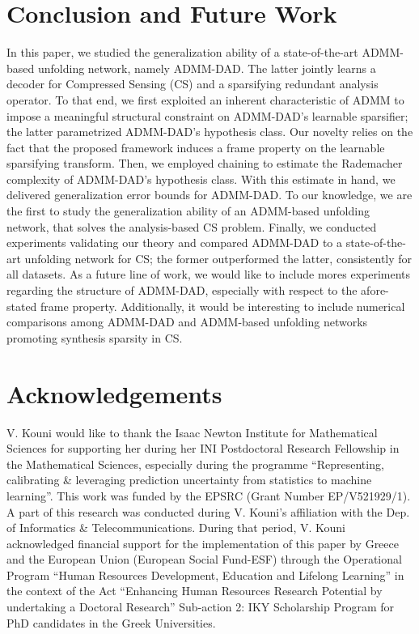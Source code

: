 \documentclass[preprint,12pt]{elsarticle}
\begin{document}
\section{Conclusion and Future Work}

In this paper, we studied the generalization ability of a state-of-the-art ADMM-based unfolding network, namely ADMM-DAD. The latter jointly learns a decoder for Compressed Sensing (CS) and a sparsifying redundant analysis operator. To that end, we first exploited an inherent characteristic of ADMM to impose a meaningful structural constraint on ADMM-DAD's learnable sparsifier; the latter parametrized ADMM-DAD's hypothesis class. Our novelty relies on the fact that the proposed framework induces a frame property on the learnable sparsifying transform. Then, we employed chaining to estimate the Rademacher complexity of ADMM-DAD's hypothesis class. With this estimate in hand, we delivered generalization error bounds for ADMM-DAD. To our knowledge, we are the first to study the generalization ability of an ADMM-based unfolding network, that solves the analysis-based CS problem. Finally, we conducted experiments validating our theory and compared ADMM-DAD to a state-of-the-art unfolding network for CS; the former outperformed the latter, consistently for all datasets. As a future line of work, we would like to include mores experiments regarding the structure of ADMM-DAD, especially with respect to the afore-stated frame property. Additionally, it would be interesting to include numerical comparisons among ADMM-DAD and ADMM-based unfolding networks promoting synthesis sparsity in CS.

\section*{Acknowledgements}
V. Kouni would like to thank the Isaac Newton Institute for Mathematical Sciences for supporting her during her INI Postdoctoral Research Fellowship in the Mathematical Sciences, especially during the programme ``Representing, calibrating \& leveraging prediction uncertainty from statistics to machine learning''. This work was funded by the EPSRC (Grant Number EP/V521929/1).\\
A part of this research was conducted during V. Kouni's affiliation with the Dep. of Informatics \& Telecommunications. During that period, V. Kouni acknowledged financial support for the implementation of this paper by Greece and the European Union (European Social Fund-ESF) through the Operational Program ``Human Resources Development, Education and Lifelong Learning'' in the context of the Act ``Enhancing Human Resources Research Potential by undertaking a Doctoral Research'' Sub-action 2: IKY Scholarship Program for PhD candidates in the Greek Universities.
\end{document}
